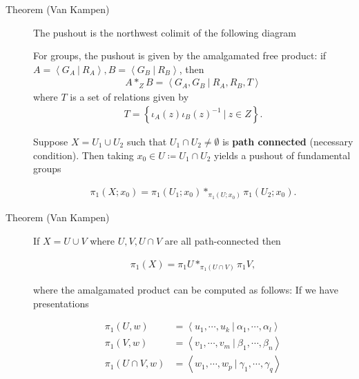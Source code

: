 \begin{description}
\item[Theorem (Van Kampen)]
The pushout is the northwest colimit of the following diagram

\begin{center}
\end{center}

For groups, the pushout is given by the amalgamated free product: if
\(A = \left\langle{G_A {~\mathrel{\Big|}~}R_A}\right\rangle, B = \left\langle{G_B {~\mathrel{\Big|}~}R_B}\right\rangle\),
then
\begin{align*}A \ast_Z B = \left\langle{G_A, G_B {~\mathrel{\Big|}~}R_A, R_B, T}\right\rangle\end{align*}
where \(T\) is a set of relations given by
\begin{align*}T = \left\{{\iota_A(z) \iota_B(z)^{-1}{~\mathrel{\Big|}~}z\in Z}\right\}.\end{align*}

Suppose \(X = U_1 \cup U_2\) such that \(U_1\cap U_2 \neq \emptyset\) is
\textbf{path connected} (necessary condition). Then taking
\(x_0 \in U\coloneqq U_1 \cap U_2\) yields a pushout of fundamental
groups

\begin{align*} \pi_1(X; x_0) = \pi_1(U_1;x_0) \ast_{\pi_1(U; x_0)} \pi_1(U_2; x_0) .\end{align*}
\item[Theorem (Van Kampen)]
If \(X = U \cup V\) where \(U, V, U\cap V\) are all path-connected then

\begin{align*} \pi_1(X) = \pi_1 U \ast_{\pi_1(U \cap V)} \pi_1 V ,\end{align*}

where the amalgamated product can be computed as follows: If we have
presentations

\begin{align*}  \pi_{1}(U, w) &= \left\langle u_{1}, \cdots, u_{k} {~\mathrel{\Big|}~}\alpha_{1}, \cdots, \alpha_{l}\right\rangle \\  \pi_{1}(V, w) &=\left\langle v_{1}, \cdots, v_{m} {~\mathrel{\Big|}~}\beta_{1}, \cdots, \beta_{n}\right\rangle \\  \pi_{1}(U \cap V, w) &=\left\langle w_{1}, \cdots, w_{p} {~\mathrel{\Big|}~}\gamma_{1}, \cdots, \gamma_{q}\right\rangle  \end{align*}


\end{description}
